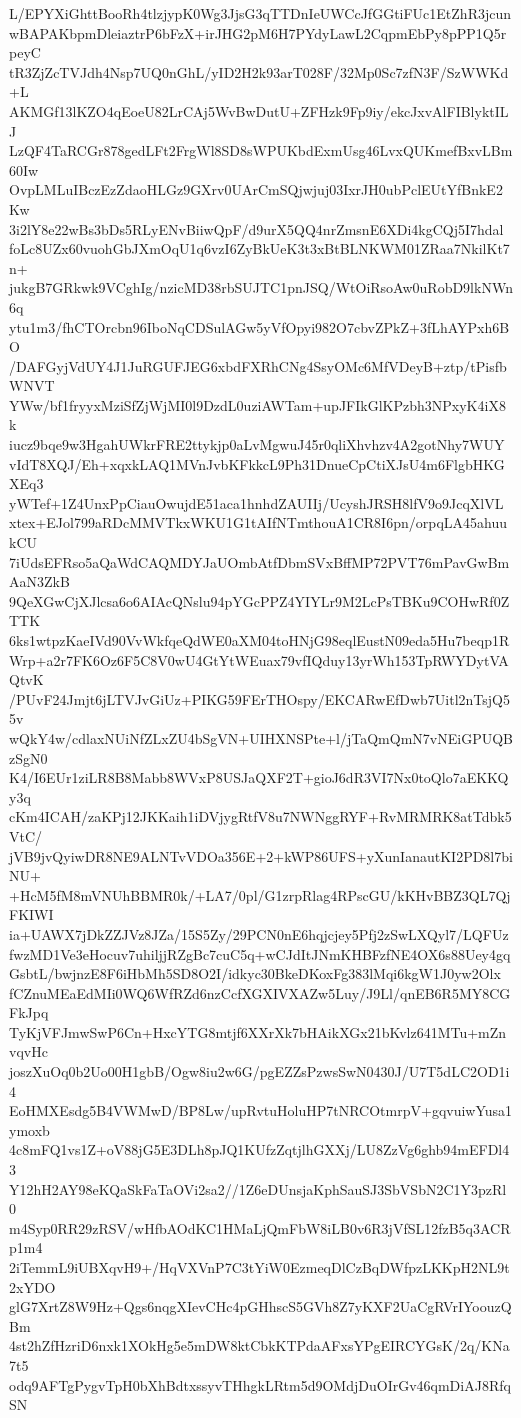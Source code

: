 L/EPYXiGhttBooRh4tlzjypK0Wg3JjsG3qTTDnIeUWCcJfGGtiFUc1EtZhR3jcun
wBAPAKbpmDleiaztrP6bFzX+irJHG2pM6H7PYdyLawL2CqpmEbPy8pPP1Q5rpeyC
tR3ZjZcTVJdh4Nsp7UQ0nGhL/yID2H2k93arT028F/32Mp0Sc7zfN3F/SzWWKd+L
AKMGf13lKZO4qEoeU82LrCAj5WvBwDutU+ZFHzk9Fp9iy/ekcJxvAlFIBlyktILJ
LzQF4TaRCGr878gedLFt2FrgWl8SD8sWPUKbdExmUsg46LvxQUKmefBxvLBm60Iw
OvpLMLuIBczEzZdaoHLGz9GXrv0UArCmSQjwjuj03IxrJH0ubPclEUtYfBnkE2Kw
3i2lY8e22wBs3bDs5RLyENvBiiwQpF/d9urX5QQ4nrZmsnE6XDi4kgCQj5I7hdal
foLc8UZx60vuohGbJXmOqU1q6vzI6ZyBkUeK3t3xBtBLNKWM01ZRaa7NkilKt7n+
jukgB7GRkwk9VCghIg/nzicMD38rbSUJTC1pnJSQ/WtOiRsoAw0uRobD9lkNWn6q
ytu1m3/fhCTOrcbn96IboNqCDSulAGw5yVfOpyi982O7cbvZPkZ+3fLhAYPxh6BO
/DAFGyjVdUY4J1JuRGUFJEG6xbdFXRhCNg4SsyOMc6MfVDeyB+ztp/tPisfbWNVT
YWw/bf1fryyxMziSfZjWjMI0l9DzdL0uziAWTam+upJFIkGlKPzbh3NPxyK4iX8k
iucz9bqe9w3HgahUWkrFRE2ttykjp0aLvMgwuJ45r0qliXhvhzv4A2gotNhy7WUY
vIdT8XQJ/Eh+xqxkLAQ1MVnJvbKFkkcL9Ph31DnueCpCtiXJsU4m6FlgbHKGXEq3
yWTef+1Z4UnxPpCiauOwujdE51aca1hnhdZAUIIj/UcyshJRSH8lfV9o9JcqXlVL
xtex+EJol799aRDcMMVTkxWKU1G1tAIfNTmthouA1CR8I6pn/orpqLA45ahuukCU
7iUdsEFRso5aQaWdCAQMDYJaUOmbAtfDbmSVxBffMP72PVT76mPavGwBmAaN3ZkB
9QeXGwCjXJlcsa6o6AIAcQNslu94pYGcPPZ4YIYLr9M2LcPsTBKu9COHwRf0ZTTK
6ks1wtpzKaeIVd90VvWkfqeQdWE0aXM04toHNjG98eqlEustN09eda5Hu7beqp1R
Wrp+a2r7FK6Oz6F5C8V0wU4GtYtWEuax79vfIQduy13yrWh153TpRWYDytVAQtvK
/PUvF24Jmjt6jLTVJvGiUz+PIKG59FErTHOspy/EKCARwEfDwb7Uitl2nTsjQ55v
wQkY4w/cdlaxNUiNfZLxZU4bSgVN+UIHXNSPte+l/jTaQmQmN7vNEiGPUQBzSgN0
K4/I6EUr1ziLR8B8Mabb8WVxP8USJaQXF2T+gioJ6dR3VI7Nx0toQlo7aEKKQy3q
cKm4ICAH/zaKPj12JKKaih1iDVjygRtfV8u7NWNggRYF+RvMRMRK8atTdbk5VtC/
jVB9jvQyiwDR8NE9ALNTvVDOa356E+2+kWP86UFS+yXunIanautKI2PD8l7biNU+
+HcM5fM8mVNUhBBMR0k/+LA7/0pl/G1zrpRlag4RPscGU/kKHvBBZ3QL7QjFKIWI
ia+UAWX7jDkZZJVz8JZa/15S5Zy/29PCN0nE6hqjcjey5Pfj2zSwLXQyl7/LQFUz
fwzMD1Ve3eHocuv7uhiljjRZgBc7cuC5q+wCJdItJNmKHBFzfNE4OX6s88Uey4gq
GsbtL/bwjnzE8F6iHbMh5SD8O2I/idkyc30BkeDKoxFg383lMqi6kgW1J0yw2Olx
fCZnuMEaEdMIi0WQ6WfRZd6nzCcfXGXIVXAZw5Luy/J9Ll/qnEB6R5MY8CGFkJpq
TyKjVFJmwSwP6Cn+HxcYTG8mtjf6XXrXk7bHAikXGx21bKvlz641MTu+mZnvqvHc
joszXuOq0b2Uo00H1gbB/Ogw8iu2w6G/pgEZZsPzwsSwN0430J/U7T5dLC2OD1i4
EoHMXEsdg5B4VWMwD/BP8Lw/upRvtuHoluHP7tNRCOtmrpV+gqvuiwYusa1ymoxb
4c8mFQ1vs1Z+oV88jG5E3DLh8pJQ1KUfzZqtjlhGXXj/LU8ZzVg6ghb94mEFDl43
Y12hH2AY98eKQaSkFaTaOVi2sa2//1Z6eDUnsjaKphSauSJ3SbVSbN2C1Y3pzRl0
m4Syp0RR29zRSV/wHfbAOdKC1HMaLjQmFbW8iLB0v6R3jVfSL12fzB5q3ACRp1m4
2iTemmL9iUBXqvH9+/HqVXVnP7C3tYiW0EzmeqDlCzBqDWfpzLKKpH2NL9t2xYDO
glG7XrtZ8W9Hz+Qgs6nqgXIevCHc4pGHhscS5GVh8Z7yKXF2UaCgRVrIYoouzQBm
4st2hZfHzriD6nxk1XOkHg5e5mDW8ktCbkKTPdaAFxsYPgEIRCYGsK/2q/KNa7t5
odq9AFTgPygvTpH0bXhBdtxssyvTHhgkLRtm5d9OMdjDuOIrGv46qmDiAJ8RfqSN
